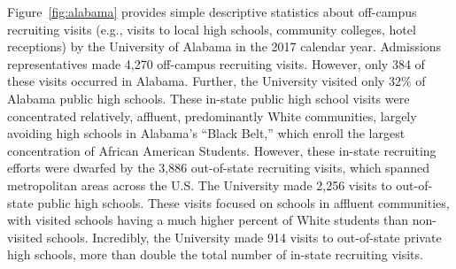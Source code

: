 \documentclass[twoside]{article}
\begin{document}
Figure~\ref{fig:alabama} provides simple descriptive statistics about off-campus recruiting visits (e.g., visits to local high schools, community colleges, hotel receptions) by the University of Alabama in the 2017 calendar year.  Admissions representatives made 4,270 off-campus recruiting visits.  However, only 384 of these visits occurred in Alabama.  Further, the University visited only 32\% of Alabama public high schools. These in-state public high school visits were concentrated relatively, affluent, predominantly White communities, largely avoiding high schools in Alabama's ``Black Belt,'' which enroll the largest concentration of African American Students.  However, these in-state recruiting efforts were dwarfed by the 3,886 out-of-state recruiting visits, which spanned metropolitan areas across the U.S. The University made 2,256 visits to out-of-state public high schools. These visits focused on schools in affluent communities, with visited schools having a much higher percent of White students than non-visited schools.  Incredibly, the University made 914 visits to out-of-state private high schools, more than double the total number of in-state recruiting visits.

\end{document}
